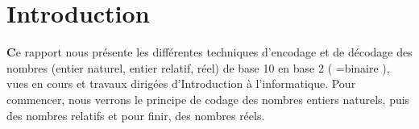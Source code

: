 \documentclass{article}
\begin{document}


\newpage
\renewcommand{\contentsname}{Sommaire}
\tableofcontents


\Large
\newpage
\section{Introduction}
\textbf{C}e rapport nous pr\'esente les diff\'erentes techniques d'encodage et de d\'ecodage des nombres (entier naturel, entier relatif, r\'eel) de base 10 en base 2 ( =binaire ), vues en cours et travaux dirig\'ees d'Introduction \`a l'informatique. 
\newline Pour commencer, nous verrons le principe de codage des nombres entiers naturels, puis des nombres relatifs et pour finir, des nombres r\'eels.


\newpage
\end{document}
